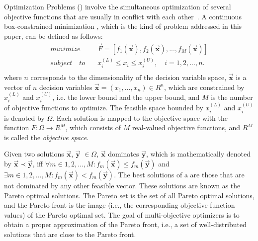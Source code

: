 Optimization Problems (\MOPS{}) 
involve the simultaneous optimization of several objective functions that are usually in conflict with each other~\cite{Joel:Kalyanmoy}. 
%
A continuous box-constrained minimization \MOP{}, which is the kind of problem addressed in this paper, can be defined as follows:
\begin{equation}
   \begin{split}
    minimize \quad & \vec{F} = [f_1(\vec{\mathbf{x}}), f_2(\vec{\mathbf{x}}), ..., f_M(\vec{\mathbf{x}})] \\
   subject \quad to \quad &  x_i^{(L)} \leq x_i \leq x_i^{(U)}, \quad i=1,2,..., n. \\
   \end{split}
\end{equation}
where $n$ corresponds to the dimensionality of the decision variable space, $\vec{\mathbf{x}}$ is a vector of $n$ 
decision variables $\vec{\mathbf{x}}=(x_1, ..., x_n) \in R^n$, which are constrained by $x_i^{(L)}$ 
and $x_i^{(U)}$, i.e. the lower bound and the upper bound, and $M$ is the number of objective functions
to optimize.
%
The feasible space bounded by $x_i^{(L)}$ and $x_i^{(U)}$ is denoted by $\Omega$.
Each solution is mapped to the objective space with the function $F : \Omega \rightarrow R^M$, 
which consists of $M$ real-valued objective functions, and $R^M$ is called the \textit{objective space}. 

Given two solutions $\vec{\mathbf{x}}$, $\vec{\mathbf{y}}$ $\in \Omega$, $\vec{\mathbf{x}}$ dominates $\vec{\mathbf{y}}$, 
which is mathematically denoted by $\vec{\mathbf{x}} \prec \vec{\mathbf{y}}$, iff $\forall m \in {1,2,...,M} : 
f_m(\vec{\mathbf{x}}) \leq f_m(\vec{\mathbf{y}})$ and $\exists  m \in {1,2,...,M} : f_m(\vec{\mathbf{x}}) < f_m(\vec{\mathbf{y}})$.
%
The best solutions of a \MOP{} are those that are not dominated by any other feasible vector.
%
These solutions are known as the Pareto optimal solutions.
%
The Pareto set is the set of all Pareto optimal solutions, and the Pareto front is the image (i.e., the corresponding
objective function values) of the Pareto optimal set. 
%
The goal of multi-objective optimizers is to obtain a proper approximation of the Pareto front, i.e., 
a set of well-distributed solutions that are close to the Pareto front.

